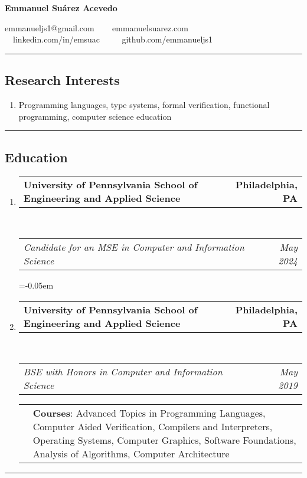 \documentclass[letterpaper]{article}
\makeatletter
\newcommand*{\tabulardef}[3]{\begin{tabular}[t]{@{}lp{\dimexpr\linewidth-#1}@{}}
    #2&#3
\end{tabular}}
\newcommand{\headerrow}[2]
{\begin{tabular*}{\linewidth}{l@{\extracolsep{\fill}}r}
	#1 &
	#2 \\
\end{tabular*}}
\makeatother
\begin{document}
\begin{center}
{\LARGE \textbf{Emmanuel Suárez Acevedo}}

emmanueljs1@gmail.com \ \textbullet
\ \ emmanuelsuarez.com \\

\ \ linkedin.com/in/emsuac \ \ \textbullet
\ \ github.com/emmanueljs1\\
\end{center}

\hrule
\vspace{-0.6em}
\subsection*{Research Interests}
\begin{enumerate}[label=]
	\parskip=-0.25em

    \item Programming languages, type systems, formal verification, functional programming, computer science education
\end{enumerate}

\hrule
\vspace{-0.6em}
\subsection*{Education}

\begin{enumerate}[label=]
	\parskip=-0.05em
	\item 
	\headerrow
		{\textbf{University of Pennsylvania School of Engineering and Applied Science}}
		{\textbf{Philadelphia, PA}}
	\\
	\headerrow
		{\emph{Candidate for an MSE in Computer and Information Science}}
		{\emph{May 2024}}

	\parskip=-0.05em
	\item 
	\headerrow
		{\textbf{University of Pennsylvania School of Engineering and Applied Science}}
		{\textbf{Philadelphia, PA}}
	\\
	\headerrow
		{\emph{BSE with Honors in Computer and Information Science}}
		{\emph{May 2019}}
        \tabulardef{2.5cm}{}{\textbf{Courses}: Advanced Topics in Programming Languages, Computer Aided Verification, Compilers and Interpreters, Operating Systems, Computer Graphics, Software Foundations, Analysis of Algorithms, Computer Architecture }

\end{enumerate}

\hrule
\vspace{-0.6em}
\end{document}
